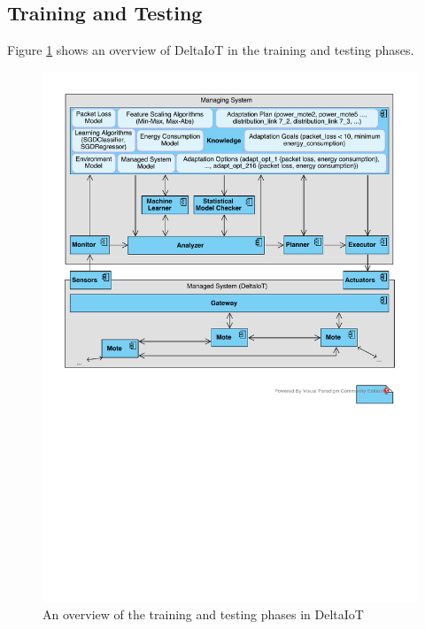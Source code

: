 \documentclass[a4paper,12pt]{article}
\begin{document}
\subsection{Training and Testing}
Figure \ref{DeltaIoTTrainingTestingView} shows an overview of DeltaIoT in the training and testing phases. 
\begin{figure}[H]
    \centering
    \includegraphics[keepaspectratio, width=\linewidth]{figures/DeltaIoTTrainingTestingView.pdf}
    \caption{An overview of the training and testing phases in DeltaIoT}
    \label{DeltaIoTTrainingTestingView}
\end{figure}
\end{document}
